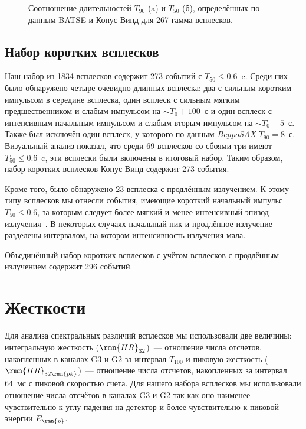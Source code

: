 \begin{figure}[h]
  \begin{minipage}[h]{0.5\textwidth}
  \end{minipage}
  \hfill
  \begin{minipage}[h]{0.5\textwidth}
  \end{minipage}
  \caption{Соотношение длительностей $T_{90}$ (a) и $T_{50}$ (б), определённых по 
  данным BATSE и Конус-Винд для 267 гамма-всплесков.}
  \label{img:T90andT50_KWvsBATSE}  
\end{figure}

\subsection{Набор коротких всплесков}
Наш набор из 1834 всплесков содержит 273 событий с $T_{50} \leq 0.6$~c. 
Среди них было обнаружено четыре очевидно длинных всплеска: два с сильным коротким 
импульсом в середине всплеска, %
один всплеск с сильным мягким предшественником и слабым импульсом на $\sim T_0+100$~с %
и один всплеск с интенсивным начальным импульсом и слабым вторым импульсом на $\sim T_0+5$~с. %
Также был исключён один всплеск, %
у которого по данным \textit{BeppoSAX} $T_{90} = 8$~с. Визуальный анализ показал, 
что среди 69 всплесков со сбоями три имеют $T_{50} \leq 0.6$~c, эти всплески были включены в итоговый набор. 
Таким образом, набор коротких всплесков Конус-Винд содержит 273 события.

Кроме того, было обнаружено 23 всплеска с продлённым излучением. К этому типу 
всплесков мы отнесли события, имеющие короткий начальный импульс $T_{50} \leq 0.6$, 
за которым следует более мягкий и менее интенсивный эпизод 
излучения~\citep{Frederiks_2004ASPC, Norris_2011ApJ, Norris_and_Bonnel_2006}. 
В некоторых случаях начальный пик и продлённое излучение разделены интервалом, 
на котором интенсивность излучения мала.

Объединённый набор коротких всплесков с учётом всплесков с продлённым излучением 
содержит 296 событий.

\clearpage

\section{Жесткости}\label{sec:Hardness}
Для анализа спектральных различий всплесков мы использовали две величины: интегральную 
жесткость ($\rmn{HR}_{32}$)~--- отношение числа отсчетов, накопленных в каналах G3 и G2 
за интервал $T_{100}$ и пиковую жесткость ($\rmn{HR}_{32\rmn{pk}}$)~--- отношение числа отсчетов, 
накопленных за интервал 64~мс с пиковой скоростью счета. Для нашего набора 
всплесков мы использовали отношение числа отсчётов в каналах G3 и G2 так как 
оно наименее чувствительно к углу падения на детектор и более чувствительно 
к пиковой энергии $E_{\rmn{p}}$.  

